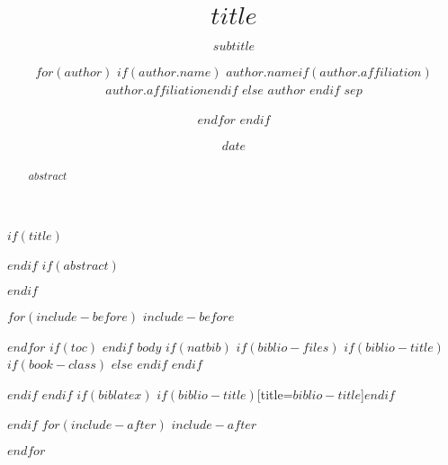 \documentclass[$if(fontsize)$$fontsize$,$endif$$if(lang)$$lang$,$endif$$if(papersize)$$papersize$,$endif$$for(classoption)$$classoption$$sep$,$endfor$]{$documentclass$}
\title{$title$}
\subtitle{$subtitle$}
\author{$for(author)$ %
$if(author.name)$ %
$author.name$$if(author.affiliation)$\\$author.affiliation$$endif$ %
$else$ %
$author$ %
$endif$ %
$sep$ \and %
$endfor$ %
$endif$ %
}
\date{$date$}
\begin{document}
$if(title)$
\maketitle
$endif$
$if(abstract)$
\begin{abstract}
$abstract$
\end{abstract}
$endif$

$for(include-before)$
$include-before$

$endfor$
$if(toc)$
{
\hypersetup{linkcolor=black}
\setcounter{tocdepth}{$toc-depth$}
\tableofcontents
}
$endif$
$body$
$if(natbib)$
$if(biblio-files)$
$if(biblio-title)$
$if(book-class)$
\renewcommand\bibname{$biblio-title$}
$else$
\renewcommand\refname{$biblio-title$}
$endif$
$endif$


$endif$
$endif$
$if(biblatex)$
\printbibliography$if(biblio-title)$[title=$biblio-title$]$endif$

$endif$
$for(include-after)$
$include-after$

$endfor$
\end{document}
